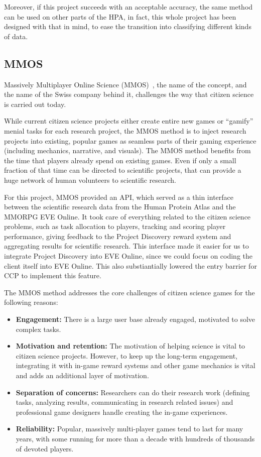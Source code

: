 Moreover, if this project succeeds with an acceptable accuracy, the same method can be used on other parts of the HPA, in fact, this whole project has been designed with that in mind, to ease the transition into classifying different kinds of data.

\subsection{MMOS}

Massively Multiplayer Online Science (MMOS)~\cite{mmos}, the name of the concept, and the name of the Swiss company behind it, challenges the way that citizen science is carried out today. 

While current citizen science projects either create entire new games or ``gamify'' menial tasks for each research project, the MMOS method is to inject research projects into existing, popular games as seamless parts of their gaming experience (including mechanics, narrative, and visuals). The MMOS method benefits from the time that players already spend on existing games. Even if only a small fraction of that time can be directed to scientific projects, that can provide a huge network of human volunteers to scientific research.

For this project, MMOS provided an API, which served as a thin interface between the scientific research data from the Human Protein Atlas and the MMORPG EVE Online. It took care of everything related to the citizen science problems, such as task allocation to players, tracking and scoring player performance, giving feedback to the Project Discovery reward system and aggregating results for scientific research. This interface made it easier for us to integrate Project Discovery into EVE Online, since we could focus on coding the client itself into EVE Online. This also substiantially lowered the entry barrier for CCP to implement this feature.

The MMOS method addresses the core challenges of citizen science games for the following reasons:

\begin{itemize}
\item {\bf Engagement:} There is a large user base already engaged, motivated to solve complex tasks.

\item {\bf Motivation and retention:} The motivation of helping 
science is vital to citizen science projects. However, to keep up the long-term engagement, integrating it with in-game reward systems and other game mechanics is vital and adds an additional layer of motivation.

\item {\bf Separation of concerns:} Researchers can do their research work (defining tasks, analyzing results, communicating in research related issues) and professional game designers handle creating the in-game experiences.

\item {\bf Reliability:} Popular, massively multi-player games tend to last for many years, with some running for more than a decade with hundreds of thousands of devoted players.
\end{itemize}


